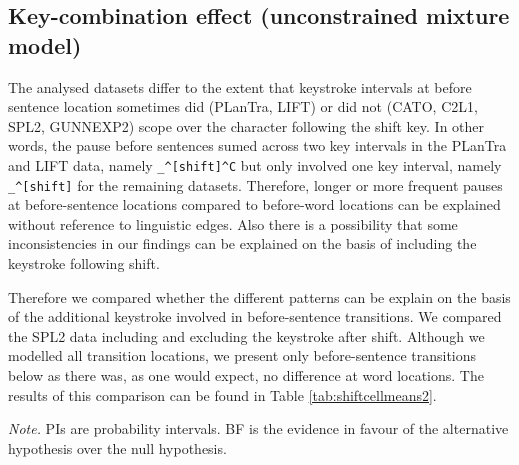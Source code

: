 \clearpage
\makeatletter
\efloat@restorefloats
\makeatother


\begin{appendix}
\section{}
\hypertarget{key-combination-effect-unconstrained-mixture-model}{%
\subsection{Key-combination effect (unconstrained mixture
model)}\label{key-combination-effect-unconstrained-mixture-model}}

The analysed datasets differ to the extent that keystroke intervals at
before sentence location sometimes did (PLanTra, LIFT) or did not (CATO,
C2L1, SPL2, GUNNEXP2) scope over the character following the shift key.
In other words, the pause before sentences sumed across two key
intervals in the PLanTra and LIFT data, namely
\texttt{\_\^{}{[}shift{]}\^{}C} but only involved one key interval,
namely \texttt{\_\^{}{[}shift{]}} for the remaining datasets. Therefore,
longer or more frequent pauses at before-sentence locations compared to
before-word locations can be explained without reference to linguistic
edges. Also there is a possibility that some inconsistencies in our
findings can be explained on the basis of including the keystroke
following shift.

Therefore we compared whether the different patterns can be explain on
the basis of the additional keystroke involved in before-sentence
transitions. We compared the SPL2 data including and excluding the
keystroke after shift. Although we modelled all transition locations, we
present only before-sentence transitions below as there was, as one
would expect, no difference at word locations. The results of this
comparison can be found in Table \ref{tab:shiftcellmeans2}.

\begin{center}
\begin{ThreePartTable}

\begin{TableNotes}[para]
\normalsize{\textit{Note.} PIs are probability intervals. BF is the evidence in favour of the alternative hypothesis over the null hypothesis.}
\end{TableNotes}

\footnotesize{

}
\end{ThreePartTable}
\end{center}
\end{appendix}
